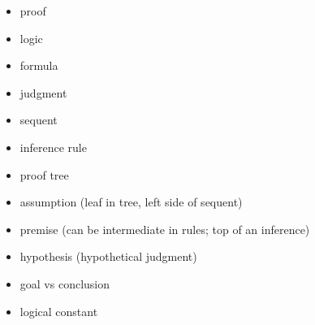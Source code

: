 \documentclass[conference]{IEEEtran}
\begin{document}
\begin{itemize}
    \item proof
    \item logic
    \item formula
    \item judgment
    \item sequent
    \item inference rule
    \item proof tree
    \item assumption (leaf in tree, left side of sequent)
    \item premise (can be intermediate in rules; top of an inference)
    \item hypothesis (hypothetical judgment)
    \item goal vs conclusion
    \item logical constant
\end{itemize}



\end{document}
